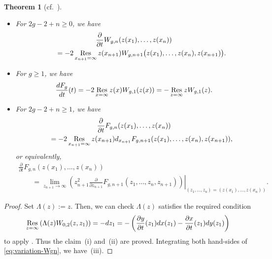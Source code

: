 \documentclass[pdftex]{sigma}
\newtheorem{thm}{Theorem}[section]
\theoremstyle{definition}
\numberwithin{equation}{section}
\def\p{\partial}
\newcommand{\Res}{\mathop{\rm Res}}
\begin{document}
\begin{thm} [cf.~]\label{thm:variation}\quad
\begin{itemize}\itemsep=0pt
\item[$(i)$]
For $2g-2+n \ge 0$, we have
\begin{gather}
\frac{\p}{\p t} W_{g,n}(z(x_{1}), \dots, z(x_{n}))\nonumber\\
\qquad{}
= -2\Res_{x_{n+1}=\infty} z(x_{n+1})
W_{g,n+1}\bigl( z(x_{1}),\dots,z(x_{n}),z(x_{n+1}) \bigr).\label{eq:variation-Wgn}
\end{gather}
\item[$(ii)$]
For $g \ge 1$, we have
\begin{gather} \label{eq:dt-closed-Fg}
\frac{dF_{g}}{dt}(t)
 = - 2\Res_{x=\infty} z(x) W_{g,1}(z(x))
= -\Res_{z=\infty} z W_{g,1}(z).
\end{gather}
\item[$(iii)$]
For $2g-2+ n \ge 1$, we have
\begin{gather*} %
\frac{\p}{\p t} F_{g,n}(z(x_{1}),\dots,z(x_{n})) \\
\qquad{} =
- 2\Res_{x_{n+1}=\infty} z(x_{n+1})
d_{x_{n+1}} F_{g,n+1}(z(x_{1}),\dots,z(x_{n}),z(x_{n+1})),
\end{gather*}
or equivalently,
\begin{gather}
\frac{\p}{\p t} F_{g,n}(z(x_{1}),\dots,z(x_{n})) \nonumber\\
\qquad{}= \lim_{z_{n+1} \rightarrow \infty} \left.
\left( z_{n+1}^{2}
\frac{\p}{\p z_{n+1}}F_{g,n+1}(z_{1},\dots,z_{n},z_{n+1})\right)
\right|_{(z_{1},\dots,z_{n})=(z(x_{1}), \dots, z(x_{n}))}. \label{eq:variation-openFgn-2}
\end{gather}
\end{itemize}
\end{thm}

\begin{proof}
Set $\Lambda(z) := z$.
Then, we can check $\Lambda(z)$ satisf\/ies
the required condition
\begin{gather*} %
\Res_{z=\infty} \left( \Lambda(z) W_{0,2}(z,z_{1}) \right) = - dz_{1}
= - \left(\frac{\p y}{\p t}(z_{1}) dx(z_{1}) -
\frac{\p x}{\p t}(z_{1}) dy(z_{1}) \right)
\end{gather*} %
to apply \cite[Theorem~5.1]{EO07}. Thus the claim~(i) and~(ii)
are proved. Integrating both hand-sides of
\eqref{eq:variation-Wgn}, we have~(iii).
\end{proof}
\end{document}
